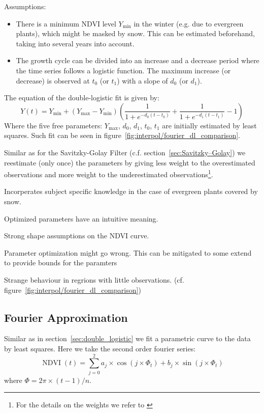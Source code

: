 Assumptions:
\begin{itemize}
  \item There is a minimum NDVI level $Y_{\min}$ in the winter (e.g. due to evergreen plants), which might be masked by snow. This can be estimated beforehand, taking into several years into account.
  \item The growth cycle can be divided into an increase and a decrease period where the time series follows a logistic function. The maximum increase (or decrease) is observed at $t_0$ (or $t_1$) with a slope of $d_0$ (or $d_1$).
\end{itemize}

The equation of the double-logistic fit is given by:
\begin{equation*}
  Y(t) = Y_{\min} + \left(Y_{\max}-Y_{\min}\right)\left(\frac{1}{1+e^{-d_0(t-t_0)}}+\frac{1}{1+e^{-d_1(t-t_1)}}-1\right)
\end{equation*}
Where the five free parameters: $Y_{\max}$, $d_0$, $d_1$, $t_0$, $t_1$ are initially estimated by least squares. Such fit can be seen in figure~\ref{fig:interpol/fourier_dl_comparison}.

Similar as for the Savitzky-Golay Filter (c.f. section~\ref{sec:Savitzky–Golay}) we reestimate (only once) the parameters by giving less weight to the overestimated observations and more weight to the underestimated observations\footnote{For the details on the weights we refer to \cite{beckImprovedMonitoringVegetation2006}}.

\begin{my_pros_cons_table}{
    \item Incorperates subject specific knowledge in the case of evergreen plants covered by snow.
    \item Optimized parameters have an intuitive meaning.
  }{
    \item Strong shape assumptions on the NDVI curve.
    \item Parameter optimization might go wrong. This can be mitigated to some extend to provide bounds for the paramters
    \item Strange behaviour in regrions with little observations. (cf. figure~\ref{fig:interpol/fourier_dl_comparison})
  }
\end{my_pros_cons_table}


\subsection{Fourier Approximation}
\label{sec:fourier_approx}
Similar as in section~\ref{sec:double_logistic} we fit a parametric curve to the data by least squares. Here we take the second order fourier series:
$$
  \operatorname{NDVI}(t)=\sum_{j=0}^{2} a_{j} \times \cos \left(j \times \Phi_{t}\right)+b_{j} \times \sin \left(j \times \Phi_{t}  \right)
$$
where $\Phi=2 \pi \times(t-1) / n$.

